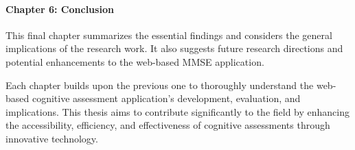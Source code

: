 \paragraph{Chapter 6: Conclusion} This final chapter summarizes the essential findings and considers the general implications of the research work. It also suggests future research directions and potential enhancements to the web-based MMSE application.

Each chapter builds upon the previous one to thoroughly understand the web-based cognitive assessment application's development, evaluation, and implications. This thesis aims to contribute significantly to the field by enhancing the accessibility, efficiency, and effectiveness of cognitive assessments through innovative technology.